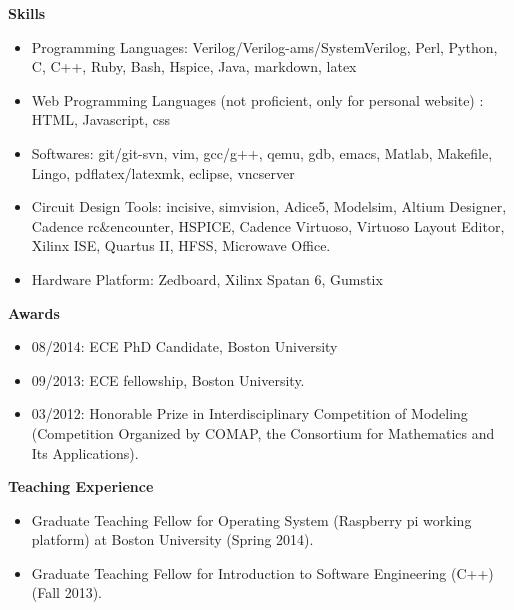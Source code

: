 \documentclass[]{article}
\begin{document}
\noindent \textbf{Skills}
\begin{itemize}
\item Programming Languages:  Verilog/Verilog-ams/SystemVerilog, Perl, Python, C, C++, Ruby, Bash,
Hspice, Java, markdown, latex
\item Web Programming Languages (not proficient, only for personal website) : HTML, Javascript, css
\item Softwares: git/git-svn, vim, gcc/g++, qemu, gdb, emacs, Matlab, Makefile, Lingo,
pdflatex/latexmk, eclipse, vncserver
\item Circuit Design Tools:  incisive, simvision, Adice5, Modelsim, Altium Designer, Cadence
rc$\&$encounter, HSPICE, Cadence Virtuoso, Virtuoso Layout Editor, Xilinx ISE, Quartus II, HFSS,
Microwave Office. 
\item Hardware Platform: Zedboard, Xilinx Spatan 6, Gumstix

\end{itemize}
\noindent \textbf{Awards}
\begin{itemize}
\item 08/2014: ECE PhD Candidate, Boston University
\item 09/2013:  ECE fellowship, Boston University.

\item 03/2012:  Honorable Prize in Interdisciplinary Competition of Modeling
(Competition Organized by COMAP, the Consortium for Mathematics and Its
Applications).



\end{itemize}

\noindent \textbf{Teaching Experience}
\begin{itemize}
\item Graduate Teaching Fellow for Operating System (Raspberry pi working platform) at Boston
University
(Spring 2014).
\item Graduate Teaching Fellow for Introduction to Software Engineering (C++) (Fall
2013).
\end{itemize}
\end{document}
